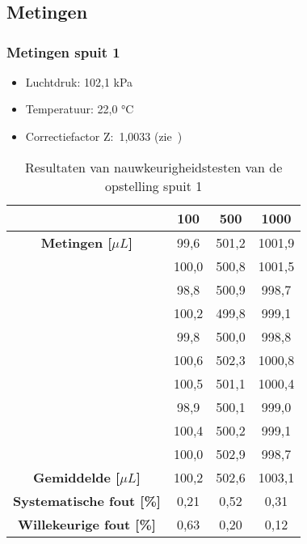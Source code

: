 \chapter{}
\section{Metingen}
\subsection{Metingen spuit 1}
\begin{itemize}
    \item Luchtdruk: 102,1 kPa
    \item Temperatuur: 22,0 °C
    \item Correctiefactor Z:\ 1,0033 (zie\ \cite{RN50})
\end{itemize}
\begin{table}[H] 
    \centering 
    \caption{Resultaten van nauwkeurigheidstesten van de opstelling spuit 1}
    \begin{tabular}{|c|c|c|c|}
        \hline
        \textbf{\rule{0pt}{3ex} Gewenste Volume [$\mu L$]} & 100 & 500 & 1000 \\
        \hline
        \textbf{Metingen [$\mu L$]} & 99,6 & 501,2 & 1001,9\\
        &100,0 & 500,8 & 1001,5\\
        &98,8 & 500,9 & 998,7\\
        &100,2 & 499,8 & 999,1\\
        &99,8 & 500,0 & 998,8\\
        &100,6 & 502,3 & 1000,8\\
        &100,5 & 501,1 & 1000,4\\
        &98,9 & 500,1 & 999,0\\
        &100,4 & 500,2 & 999,1\\
        &100,0 & 502,9 & 998,7\\
        \hline
        \textbf{Gemiddelde [$\mu L$]} & 100,2 & 502,6 & 1003,1\\
        \textbf{Systematische fout [\%]} & 0,21 & 0,52 & 0,31\\
        \textbf{Willekeurige fout [\%]} & 0,63 & 0,20 & 0,12\\
        \hline
    \end{tabular}\label{tab:resultaten_spuit_1}
\end{table}

\pagebreak

